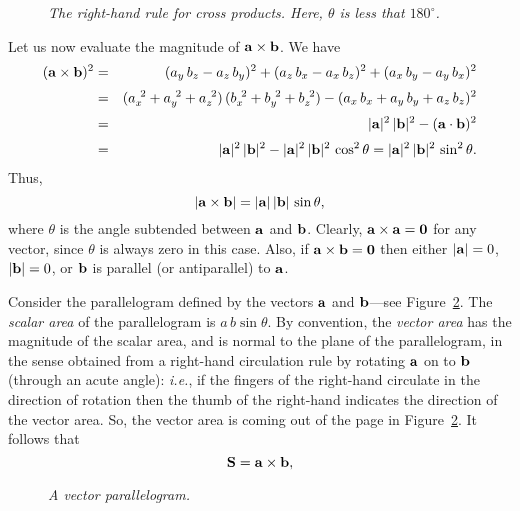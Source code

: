 \begin{figure}
\epsfysize=1.75in
\centerline{}
\caption{\em The right-hand rule for cross products. Here, $\theta$ is less that $180^\circ$.}\label{f6}
\end{figure}

Let us now evaluate the magnitude of ${\bf a}\times {\bf b}$. We have
\begin{eqnarray}
({\bf a}\times{\bf b})^2 &=& (a_y \,b_z-a_z\, b_y)^2 +(a_z \,b_x - a_x\, b_z)^2 +(a_x \,b_y
-a_y \,b_x)^2\nonumber\\[0.5ex]
&=& (a_x^{~2}+a_y^{~2}+a_z^{~2})\,(b_x^{~2}+b_y^{~2}+b_z^{~2}) -
(a_x\, b_x + a_y \,b_y + a_z\, b_z)^2\nonumber\\[0.5ex]
&=& |{\bf a}|^2 \,|{\bf b}|^2 - ({\bf a}\cdot {\bf b})^2\nonumber\\[0.5ex]
&=& |{\bf a}|^2 \,|{\bf b}|^2 - |{\bf a}|^2 \,|{\bf b}|^2 \,\cos^2\theta = |{\bf a}|^2\,|{\bf b}|^2\, \sin^2\theta.
\end{eqnarray}
Thus,
\begin{equation}
|{\bf a}\times{\bf b}| = |{\bf a}|\,|{\bf b}|\,\sin\theta,
\end{equation}
where $\theta$ is the angle subtended between ${\bf a}$ and ${\bf b}$.
Clearly, ${\bf a}\times{\bf a} = {\bf 0}$ for any vector, since $\theta$ is always
zero in this case. Also, if ${\bf a}\times{\bf b} = {\bf 0}$ then either
$|{\bf a}|=0$, $|{\bf b}|=0$, or ${\bf b}$ is parallel (or antiparallel) to ${\bf a}$.

Consider the parallelogram defined by the vectors ${\bf a}$ and ${\bf b}$---see Figure~\ref{f7}.
The {\em scalar area}\/ of the parallelogram is $a\,b \sin\theta$. By convention, the {\em vector area}\/ has the magnitude of the
scalar area, and is normal to the plane of the parallelogram, in the sense obtained from a right-hand circulation rule by rotating ${\bf a}$ on to
${\bf b}$ (through an acute angle): {\em i.e.}, if the fingers of the right-hand circulate in the direction of
rotation then the thumb of the right-hand indicates the direction of the vector area. So, the vector area is coming out of the
page in Figure~\ref{f7}.
It follows that
\begin{equation}
{\bf S} = {\bf a}\times {\bf b},
\end{equation}

\begin{figure}[b]
\epsfysize=1.25in
\centerline{}
\caption{\em A vector parallelogram.}\label{f7}
\end{figure}

